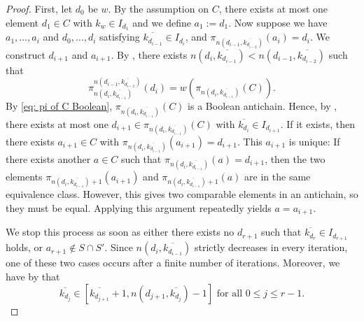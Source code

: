 \documentclass[10pt,a4paper]{amsart}
\begin{document}
\begin{proof}
    First, let $d_0$ be $w$. By the assumption on $C$, there exists at most one element $d_1 \in C$ with $k_w \in I_{d_1}$ and we define $a_1:=d_1$.
    Now suppose we have $a_1, \dots, a_{i}$ and $d_0, \dots, d_{i}$ satisfying $\overline{k_{d_{i-1}}}\in I_{d_{i}}$, and $\pi_{n(d_{i-1}, \overline{k_{d_{i-2}}})}(a_{i}) = d_{i}$.
    We construct $d_{i+1}$ and $a_{i+1}$. By , there exists $n(d_i,\overline{k_{d_{i-1}}}) < n(d_{i-1},\overline{k_{d_{i-2}}})$ such that \[\pi_{n(d_i, \overline{k_{d_{i-1}}})}^{n(d_{i-1}, \overline{k_{d_{i-2}}})}(d_i) = w(\pi_{n(d_{i}, \overline{k_{d_{i-1}}})}(C)).\]
    By \eqref{eq: pi of C Boolean}, $\pi_{n(d_i,\overline{k_{d_{i-1}}})}(C)$ is a Boolean antichain. Hence, by , there exists at most one $d_{i+1} \in \pi_{n(d_i,\overline{k_{d_{i-1}}})}(C)$ with $\overline{k_{d_i}} \in I_{d_{i+1}}$. If it exists, then there exists $a_{i+1} \in C$ with $\pi_{n(d_i, \overline{k_{d_{i-1}}})}(a_{i+1}) = d_{i+1}$. This $a_{i+1}$ is unique: If there exists another $a \in C$ such that $\pi_{n(d_i, \overline{k_{d_{i-1}}})}(a) = d_{i+1}$, then the two elements $\pi_{n(d_i, \overline{k_{d_{i-1}}})+1}(a_{i+1})$ and $\pi_{n(d_i, \overline{k_{d_{i-1}}})+1}(a)$ are in the same equivalence class. However, this gives two comparable elements in an antichain, so they must be equal. Applying this argument repeatedly yields $a = a_{i+1}$.
    
    We stop this process as soon as either there exists no $d_{r+1}$ such that $\overline{k_{d_r}} \in I_{d_{r+1}}$ holds, or $a_{r+1} \notin S \cap S'$. Since $n(d_i,\overline{k_{d_{i-1}}})$ strictly decreases in every iteration, one of these two cases occurs after a finite number of iterations.  
    Moreover, we have by  that
    \begin{equation}\label{eq: k_d_j}
        \overline{k_{d_j}} \in [\overline{k_{d_{j+1}}}+1,n(d_{j+1},\overline{k_{d_j}})-1] \text{ for all } 0 \leq j \leq r-1.
    \end{equation}


\end{proof}
\end{document}
